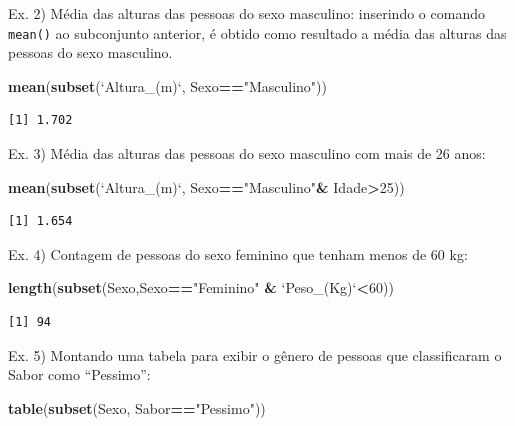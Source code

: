 \documentclass[12pt,brazil,oneside]{book}
\newenvironment{Shaded}{\begin{snugshade}}{\end{snugshade}}
\newcommand{\DataTypeTok}[1]{\textcolor[rgb]{0.13,0.29,0.53}{#1}}
\newcommand{\DecValTok}[1]{\textcolor[rgb]{0.00,0.00,0.81}{#1}}
\newcommand{\KeywordTok}[1]{\textcolor[rgb]{0.13,0.29,0.53}{\textbf{#1}}}
\newcommand{\NormalTok}[1]{#1}
\newcommand{\OperatorTok}[1]{\textcolor[rgb]{0.81,0.36,0.00}{\textbf{#1}}}
\newcommand{\StringTok}[1]{\textcolor[rgb]{0.31,0.60,0.02}{#1}}
\begin{document}
Ex. 2) Média das alturas das pessoas do sexo masculino: inserindo o comando \texttt{mean()} ao subconjunto anterior, é obtido como resultado a média das alturas das pessoas do sexo masculino.

\begin{Shaded}
\begin{Highlighting}[]
\KeywordTok{mean}\NormalTok{(}\KeywordTok{subset}\NormalTok{(}\StringTok{`}\DataTypeTok{Altura_(m)}\StringTok{`}\NormalTok{, Sexo}\OperatorTok{==}\StringTok{"Masculino"}\NormalTok{))}
\end{Highlighting}
\end{Shaded}

\begin{verbatim}
[1] 1.702
\end{verbatim}

Ex. 3) Média das alturas das pessoas do sexo masculino com mais de 26 anos:

\begin{Shaded}
\begin{Highlighting}[]
\KeywordTok{mean}\NormalTok{(}\KeywordTok{subset}\NormalTok{(}\StringTok{`}\DataTypeTok{Altura_(m)}\StringTok{`}\NormalTok{, Sexo}\OperatorTok{==}\StringTok{"Masculino"}\OperatorTok{&}\StringTok{ }\NormalTok{Idade}\OperatorTok{>}\DecValTok{25}\NormalTok{))}
\end{Highlighting}
\end{Shaded}

\begin{verbatim}
[1] 1.654
\end{verbatim}

Ex. 4) Contagem de pessoas do sexo feminino que tenham menos de 60 kg:

\begin{Shaded}
\begin{Highlighting}[]
\KeywordTok{length}\NormalTok{(}\KeywordTok{subset}\NormalTok{(Sexo,Sexo}\OperatorTok{==}\StringTok{"Feminino"} \OperatorTok{&}\StringTok{ `}\DataTypeTok{Peso_(Kg)}\StringTok{`}\OperatorTok{<}\DecValTok{60}\NormalTok{))}
\end{Highlighting}
\end{Shaded}

\begin{verbatim}
[1] 94
\end{verbatim}

Ex. 5) Montando uma tabela para exibir o gênero de pessoas que classificaram o Sabor como ``Pessimo'':

\begin{Shaded}
\begin{Highlighting}[]
\KeywordTok{table}\NormalTok{(}\KeywordTok{subset}\NormalTok{(Sexo, Sabor}\OperatorTok{==}\StringTok{"Pessimo"}\NormalTok{))}
\end{Highlighting}
\end{Shaded}
\end{document}
